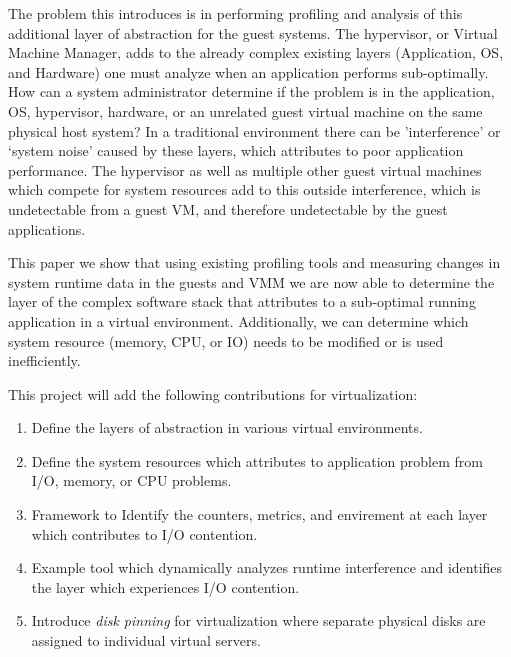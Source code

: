 \indent The problem this introduces is in performing profiling and analysis of this additional layer of abstraction for the guest systems.  The hypervisor, or Virtual Machine Manager, adds to the already complex existing layers (Application, OS, and Hardware) one must analyze when an application performs sub-optimally.  How can a system administrator determine if the problem is in the application, OS, hypervisor, hardware, or an unrelated guest virtual machine on the same physical host system?  In a traditional environment there can be 'interference' \cite{paul}or ‘system noise' caused by these layers, which attributes to poor application performance.  The hypervisor as well as multiple other guest virtual machines which compete for system resources add to this outside interference, which is undetectable from a guest VM, and therefore undetectable by the guest applications.

\indent This paper we show that using existing profiling tools and measuring changes in system runtime data in the guests and VMM we are now able to determine the layer of the complex software stack that attributes to a sub-optimal running application in a virtual environment.  Additionally, we can determine which system resource (memory, CPU, or IO) needs to be modified or is used inefficiently.

\indent This project will add the following contributions for virtualization:
\begin{enumerate}
\item Define the layers of abstraction in various virtual environments.
\item Define the system resources which attributes to application problem from I/O, memory, or CPU problems.
\item Framework to Identify the counters, metrics, and envirement at each layer which contributes to I/O contention.
\item Example tool which dynamically analyzes runtime interference and identifies the layer which experiences I/O contention.
\item Introduce \emph{disk pinning} for virtualization where separate physical disks are assigned to individual virtual servers.
\end{enumerate}


